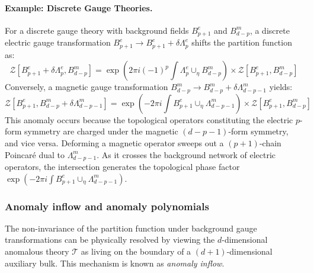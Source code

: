 \documentclass[aps,preprint,nofootinbib,preprintnumbers,eqsecnum,superscriptaddress]{revtex4}
\numberwithin{equation}{section}
\begin{document}
\paragraph*{Example: Discrete Gauge Theories.} For a discrete gauge theory with background fields $B_{p+1}^e$ and $B_{d-p}^m$, a discrete electric gauge transformation $B_{p+1}^e \to B_{p+1}^e + \delta \Lambda_p^e$ shifts the partition function as:
\begin{equation}
    \mathcal{Z}[B_{p+1}^e + \delta \Lambda_p^e, B_{d-p}^m] = \exp\left(2\pi i (-1)^p \int \Lambda_p^e \cup_{\eta} B_{d-p}^m\right) \times \mathcal{Z}[B_{p+1}^e, B_{d-p}^m]
\end{equation}
Conversely, a magnetic gauge transformation $B_{d-p}^m \to B_{d-p}^m + \delta \Lambda_{d-p-1}^m$ yields:
\begin{equation}
    \mathcal{Z}[B_{p+1}^e, B_{d-p}^m + \delta \Lambda_{d-p-1}^m] = \exp\left(-2\pi i \int B_{p+1}^e \cup_{\eta} \Lambda_{d-p-1}^m\right) \times \mathcal{Z}[B_{p+1}^e, B_{d-p}^m]
\end{equation}
This anomaly occurs because the topological operators constituting the electric $p$-form symmetry are charged under the magnetic $(d-p-1)$-form symmetry, and vice versa. Deforming a magnetic operator sweeps out a $(p+1)$-chain Poincaré dual to $\Lambda_{d-p-1}^m$. As it crosses the background network of electric operators, the intersection generates the topological phase factor $\exp\left(-2\pi i \int B_{p+1}^e \cup_{\eta} \Lambda_{d-p-1}^m\right)$.

\subsubsection{Anomaly inflow and anomaly polynomials}
The non-invariance of the partition function under background gauge transformations can be physically resolved by viewing the $d$-dimensional anomalous theory $\mathcal{T}$ as living on the boundary of a $(d+1)$-dimensional auxiliary bulk. This mechanism is known as \textit{anomaly inflow}.
\end{document}
